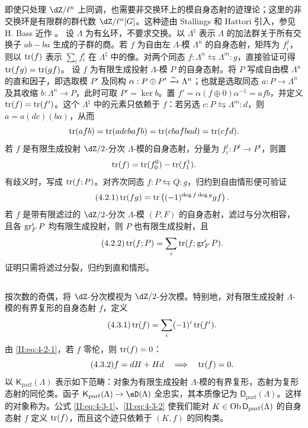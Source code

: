 \subsection{}\label{II:4-2}
即使只处理 $\dZ/\ell^n$ 上同调，也需要非交换环上的模自身态射的迹理论；这里的非交换环是有限群的群代数 $\dZ/\ell^n[G]$。这种迹由 Stallings 和 Hattori 引入，参见 H. Bass 近作 \cite{ba76}。
设 $\Lambda$ 为有幺环，不要求交换。以 $\Lambda^\natural$ 表示 $\Lambda$ 的加法群关于所有交换子 $ab-ba$ 生成的子群的商。若 $f$ 为自由左 $\Lambda$-模 $\Lambda^n$ 的自身态射，矩阵为 $f_i^j$，则以 $\operatorname{tr}(f)$ 表示 $\sum_i f_i^i$ 在 $\Lambda^\natural$ 中的像。对两个同态 $f:\Lambda^n\leftrightarrows\Lambda^m:g$，直接验证可得 $\operatorname{tr}(fg)=\operatorname{tr}(gf)$。
设 $f$ 为有限生成投射 $\Lambda$-模 $P$ 的自身态射。将 $P$ 写成自由模 $\Lambda^n$ 的直和因子，即选取模 $P'$ 及同构 $\alpha:P\oplus P'\xrightarrow\sim\Lambda^n$；也就是选取同态 $a:P\to\Lambda^n$ 及其收缩 $b:\Lambda^n\to P$，此时可取 $P'=\ker b$。置 $f'=\alpha(f\oplus0)\alpha^{-1}=afb$，并定义 $\operatorname{tr}(f)=\operatorname{tr}(f')$。这个 $\Lambda^\natural$ 中的元素只依赖于 $f$：若另选 $c:P\leftrightarrows\Lambda^m:d$，则 $a=a(dc)(ba)$，从而
\[\operatorname{tr}(afb)=\operatorname{tr}(adcbafb)=\operatorname{tr}(cbafbad)=\operatorname{tr}(cfd).\]
若 $f$ 是有限生成投射 $\dZ/2$-分次 $\Lambda$-模的自身态射，分量为 $f_i^j:P^j\to P^i$，则置
\[\operatorname{tr}(f)=\operatorname{tr}(f_0^0)-\operatorname{tr}(f_1^1).\]
有歧义时，写成 $\operatorname{tr}(f;P)$。对齐次同态 $f:P\leftrightarrows Q:g$，归约到自由情形便可验证
\begin{equation*}\tag{4.2.1}\label{II:eq:4-2-1}
\operatorname{tr}(fg)=\operatorname{tr}\left((-1)^{\deg f\deg g}gf\right).
\end{equation*}
若 $f$ 是带有限滤过的 $\dZ/2$-分次 $\Lambda$-模 $(P,F)$ 的自身态射，滤过与分次相容，且各 $\operatorname{gr}_F^iP$ 均有限生成投射，则 $P$ 也有限生成投射，且
\begin{equation*}\tag{4.2.2}\label{II:eq:4-2-2}
\operatorname{tr}(f;P)=\sum_i\operatorname{tr}(f;\operatorname{gr}_F^iP).
\end{equation*}
证明只需将滤过分裂，归约到直和情形。

\subsection{}\label{II:4-3}
按次数的奇偶，将 $\dZ$-分次模视为 $\dZ/2$-分次模。特别地，对有限生成投射 $\Lambda$-模的有界复形的自身态射 $f$，定义
\begin{equation*}\tag{4.3.1}\label{II:eq:4-3-1}
\operatorname{tr}(f)=\sum_i(-1)^i\operatorname{tr}(f^i).
\end{equation*}
由 \eqref{II:eq:4-2-1}，若 $f$ 零伦，则 $\operatorname{tr}(f)=0$：
\begin{equation*}\tag{4.3.2}\label{II:eq:4-3-2}
f=dH+Hd\quad\Longrightarrow\quad\operatorname{tr}(f)=0.
\end{equation*}
以 $\mathsf K_{\mathrm{parf}}(\Lambda)$ 表示如下范畴：对象为有限生成投射 $\Lambda$-模的有界复形，态射为复形态射的同伦类。函子 $\mathsf K_{\mathrm{parf}}(\Lambda)\to\eD(\Lambda)$ 全忠实，其本质像记为 $\mathsf D_{\mathrm{parf}}(\Lambda)$。这样的对象称为。公式 \eqref{II:eq:4-3-1}、\eqref{II:eq:4-3-2} 使我们能对 $K\in\operatorname{Ob}\mathsf D_{\mathrm{parf}}(\Lambda)$ 的自身态射 $f$ 定义 $\operatorname{tr}(f)$，而且这个迹只依赖于 $(K,f)$ 的同构类。

